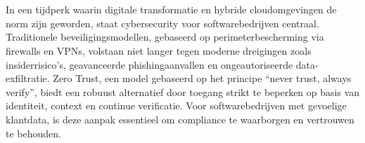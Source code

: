 
\chapter{}%
\label{ch:inleiding}



In een tijdperk waarin digitale transformatie en hybride cloudomgevingen de norm zijn geworden, staat cybersecurity voor softwarebedrijven centraal.
Traditionele beveiligingsmodellen, gebaseerd op perimeterbescherming via firewalls en VPNs, volstaan niet langer tegen moderne dreigingen zoals insiderrisico’s, geavanceerde phishingaanvallen en ongeautoriseerde data-exfiltratie.
Zero Trust, een model gebaseerd op het principe “never trust, always verify”, biedt een robuust alternatief door toegang strikt te beperken op basis van identiteit, context en continue verificatie. Voor softwarebedrijven met gevoelige klantdata, is deze aanpak essentieel om compliance te waarborgen en vertrouwen te behouden.

\section{}%
\label{sec:probleemstelling}

